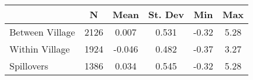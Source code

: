 \begin{tabular}{l*{5}{c}}\hline&\multicolumn{1}{c}{N}&\multicolumn{1}{c}{Mean}&\multicolumn{1}{c}{St. Dev}&\multicolumn{1}{c}{Min}&\multicolumn{1}{c}{Max}\\ \hline 
Between Village & 2126 & 0.007 & 0.531 & -0.32 & 5.28 \\
Within Village & 1924 & -0.046 & 0.482 & -0.37 & 3.27 \\
Spillovers & 1386 & 0.034 & 0.545 & -0.32 & 5.28 \\
\hline \end{tabular}
